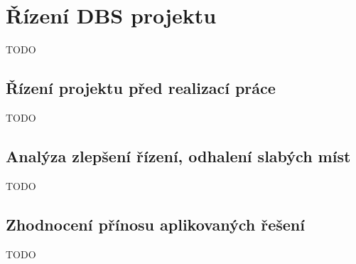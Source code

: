 \chapter{Řízení DBS projektu}

TODO

\section{Řízení projektu před realizací práce}

TODO

\section{Analýza zlepšení řízení, odhalení slabých míst}

TODO

\section{Zhodnocení přínosu aplikovaných řešení}

TODO
